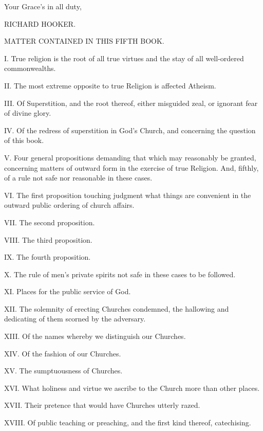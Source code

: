 \vspace*{1cm}

\hfill Your Grace’s in all duty,

\hfill RICHARD HOOKER.

\newpage

\noindent
MATTER CONTAINED IN THIS FIFTH BOOK.

\vspace{0.1in}

I. True religion is the root of all true virtues and the stay of all well-ordered commonwealths.

II. The most extreme opposite to true Religion is affected Atheism.

III. Of Superstition, and the root thereof, either misguided zeal, or ignorant fear of divine glory.

IV. Of the redress of superstition in God’s Church, and concerning the question of this book.

V. Four general propositions demanding that which may reasonably be granted, concerning matters of outward form in the exercise of true Religion. And, fifthly, of a rule not safe nor reasonable in these cases.

VI. The first proposition touching judgment what things are convenient in the outward public ordering of church affairs.

VII. The second proposition.

VIII. The third proposition.

IX. The fourth proposition.

X. The rule of men’s private spirits not safe in these cases to be followed.

XI. Places for the public service of God.

XII. The solemnity of erecting Churches condemned, the hallowing and dedicating of them scorned by the adversary.

XIII. Of the names whereby we distinguish our Churches.

XIV. Of the fashion of our Churches.

XV. The sumptuousness of Churches.

XVI. What holiness and virtue we ascribe to the Church more than other places.

XVII. Their pretence that would have Churches utterly razed.

XVIII. Of public teaching or preaching, and the first kind thereof, catechising.


